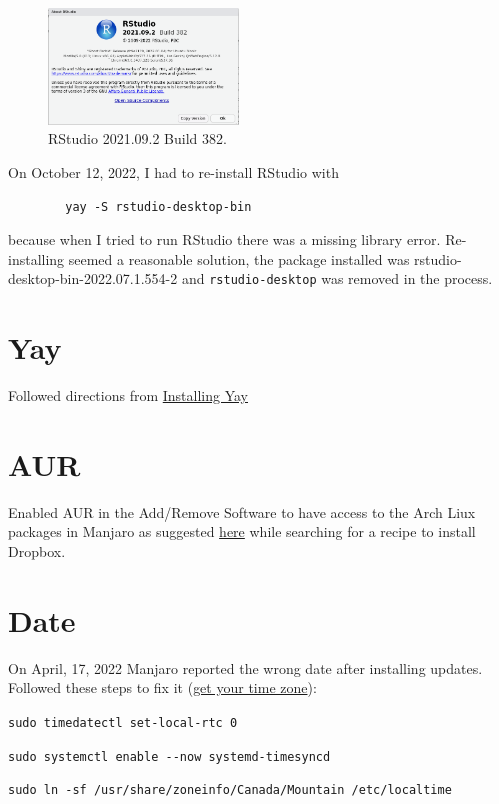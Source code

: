 \documentclass[]{scrartcl}
\begin{document}
	\begin{figure}[!htb]
		\centering
		\caption{RStudio 2021.09.2 Build 382.}
		\includegraphics[width=0.45\textwidth]{Images/RStudioSplashWindowFeb07-2022.png}
	\end{figure}
	
	On October 12, 2022, I had to re-install RStudio with
	\begin{verbatim}
		yay -S rstudio-desktop-bin
	\end{verbatim}
	
	because when I tried to run RStudio there was a missing library error. 
	Re-installing seemed a reasonable solution, the package installed was rstudio-desktop-bin-2022.07.1.554-2 and \texttt{rstudio-desktop} was removed in the process.
	
	\section{Yay}
	\label{sec:yay}
	
	Followed directions from \href{https://www.tecmint.com/install-yay-aur-helper-in-arch-linux-and-manjaro/}{Installing Yay}
	
	\section{AUR}
	
	Enabled AUR in the Add/Remove Software to have access to the Arch Liux packages in Manjaro as suggested \href{https://forum.manjaro.org/t/dropbox-install-new-to-manjaro/9576/5}{here} while searching for a recipe to install Dropbox.
	
	\section{Date}
	
	On April, 17, 2022 Manjaro reported the wrong date after installing updates.
	Followed these steps to fix it (\href{https://archived.forum.manjaro.org/t/howto-get-your-time-timezone-right-using-manjaro-windows-dual-boot/89359}{get your time zone}):
	\begin{compactenum}
		\item  \verb|sudo timedatectl set-local-rtc 0|
		\item \verb|sudo systemctl enable --now systemd-timesyncd|
		\item \verb|sudo ln -sf /usr/share/zoneinfo/Canada/Mountain /etc/localtime|
	\end{compactenum}
	
\end{document}
